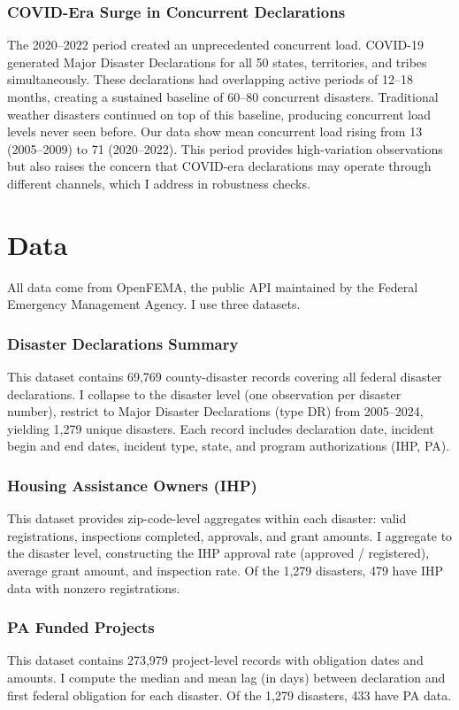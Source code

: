 \documentclass[12pt]{article}
\begin{document}
\subsubsection*{COVID-Era Surge in Concurrent Declarations} The 2020--2022 period created an unprecedented concurrent load. COVID-19 generated Major Disaster Declarations for all 50 states, territories, and tribes simultaneously. These declarations had overlapping active periods of 12--18 months, creating a sustained baseline of 60--80 concurrent disasters. Traditional weather disasters continued on top of this baseline, producing concurrent load levels never seen before. Our data show mean concurrent load rising from 13 (2005--2009) to 71 (2020--2022). This period provides high-variation observations but also raises the concern that COVID-era declarations may operate through different channels, which I address in robustness checks.

\section{Data}

All data come from OpenFEMA, the public API maintained by the Federal Emergency Management Agency. I use three datasets.

\subsubsection*{Disaster Declarations Summary} This dataset contains 69,769 county-disaster records covering all federal disaster declarations. I collapse to the disaster level (one observation per disaster number), restrict to Major Disaster Declarations (type DR) from 2005--2024, yielding 1,279 unique disasters. Each record includes declaration date, incident begin and end dates, incident type, state, and program authorizations (IHP, PA).

\subsubsection*{Housing Assistance Owners (IHP)} This dataset provides zip-code-level aggregates within each disaster: valid registrations, inspections completed, approvals, and grant amounts. I aggregate to the disaster level, constructing the IHP approval rate (approved / registered), average grant amount, and inspection rate. Of the 1,279 disasters, 479 have IHP data with nonzero registrations.

\subsubsection*{PA Funded Projects} This dataset contains 273,979 project-level records with obligation dates and amounts. I compute the median and mean lag (in days) between declaration and first federal obligation for each disaster. Of the 1,279 disasters, 433 have PA data.
\end{document}
